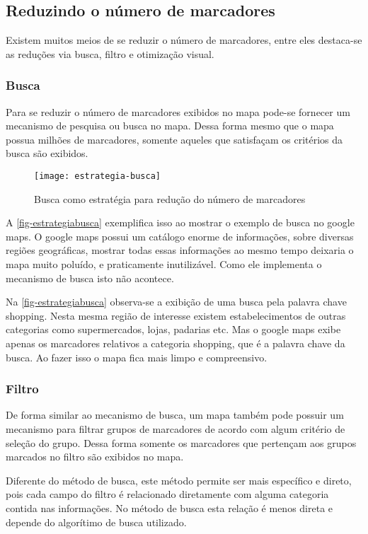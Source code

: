   \subsection{Reduzindo o número de marcadores}
  Existem muitos meios de se reduzir o número de marcadores, entre eles destaca-se as reduções via busca, filtro e otimização visual.
	\subsubsection{Busca}
	Para se reduzir  o número de marcadores exibidos no mapa pode-se fornecer um mecanismo de pesquisa ou busca no mapa. Dessa forma mesmo que o mapa possua milhões de marcadores, somente aqueles que satisfaçam os critérios da busca são exibidos.
	
	 \begin{figure}[htb]
	\caption{\label{fig-estrategiabusca}Busca como estratégia para redução do número de marcadores}
	\begin{center}
	    \texttt{[image: estrategia-busca]}
	\end{center}
	\end{figure}
	 
	 A \autoref{fig-estrategiabusca}  exemplifica isso ao mostrar o exemplo de busca no google maps. O google maps possui um catálogo enorme de informações, sobre diversas regiões geográficas, mostrar todas essas informações ao mesmo tempo deixaria o mapa muito poluído, e praticamente inutilizável. Como ele implementa o mecanismo de busca isto não acontece.
	
	 Na \autoref{fig-estrategiabusca} observa-se a exibição de uma busca pela palavra chave shopping. Nesta mesma região de interesse existem estabelecimentos de outras categorias como supermercados, lojas, padarias etc. Mas o google maps exibe apenas os marcadores relativos a categoria shopping, que é a palavra chave da busca. Ao fazer isso o mapa fica mais limpo e compreensivo.
	 
	
	\subsubsection{Filtro}
	De forma similar ao mecanismo de busca, um mapa também pode possuir um mecanismo para filtrar grupos de marcadores de acordo com algum critério de seleção do grupo. Dessa forma somente os marcadores que pertençam aos grupos marcados no filtro são exibidos no mapa. 
	
	Diferente do método de busca, este método permite ser mais específico e direto, pois cada campo do filtro é relacionado diretamente com alguma categoria contida nas informações. No método de busca esta relação é menos direta e depende do algorítimo de busca utilizado.  
	
